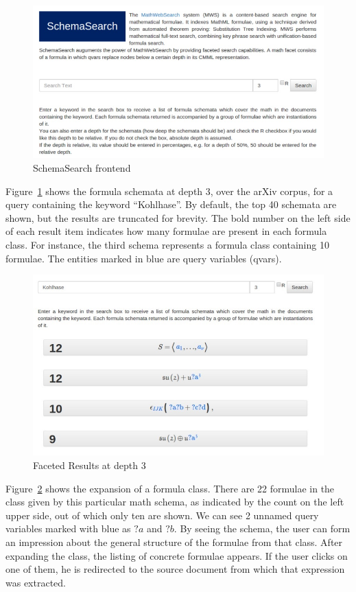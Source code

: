 \documentclass{deliverablereport}
\begin{document}
\begin{figure}[h]
\centering
 \includegraphics[scale=0.9]{figure5.jpg}
 \caption{SchemaSearch frontend}
 \label{fig:schema_search}
\end{figure}

Figure~\ref{fig:schema_search} shows the formula schemata at depth 3, over the arXiv corpus, for a query containing the keyword “Kohlhase”. By default, the top 40 schemata are shown, but the results are truncated for brevity. The bold number on the left side of each result item indicates how many formulae are present in each formula class. For instance, the third schema represents a formula class containing 10 formulae. The entities marked in blue are query variables (qvars). 

\begin{figure}[H]
\centering
 \includegraphics[scale=0.8]{figure6.jpg}
 \caption{Faceted Results at depth 3}
 \label{fig:depth3}
\end{figure}

Figure~\ref{fig:depth3} shows the expansion of a formula class. There are 22 formulae in the class given by this particular math schema, as indicated by the count on the left upper side, out of which only ten are shown. We can see 2 unnamed query variables marked with blue as $?a$ and $?b$. By seeing the schema, the user can form an impression about the general structure of the formulae from that class. After expanding the class, the listing of concrete formulae appears. If the user clicks on one of them, he is redirected to the source document from which that expression was extracted. 
\end{document}

